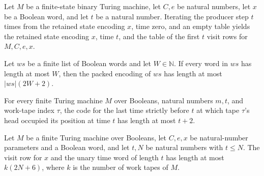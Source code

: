 \begin{lemma}
\label{Complexity.clVisitStep_orbit}
\leanok
{}
Let $M$ be a finite-state binary Turing machine, let $C,e$ be natural numbers, let $x$
be a Boolean word, and let $t$ be a natural number. Iterating the producer step $t$
times from the retained state encoding $x$, time zero, and an empty table yields the
retained state encoding $x$, time $t$, and the table of the first $t$ visit rows for
$M,C,e,x$.
\end{lemma}

\begin{lemma}
\label{Complexity.clFields_size}
\leanok
{}
Let $ws$ be a finite list of Boolean words and let $W\in\mathbb N$. If every word in
$ws$ has length at most $W$, then the packed encoding of $ws$ has length at most
$|ws|(2W+2)$.
\end{lemma}

\begin{lemma}
\label{Complexity.clVisitCode_size}
\leanok
{}
For every finite Turing machine $M$ over Booleans, natural numbers $m,t$, and work-tape
index $\tau$, the code for the last time strictly before $t$ at which tape $\tau$'s head
occupied its position at time $t$ has length at most $t+2$.
\end{lemma}

\begin{lemma}
\label{Complexity.clVisitRow_size}
\leanok
{}
Let $M$ be a finite Turing machine over Booleans, let $C,e,x$ be natural-number
parameters and a Boolean word, and let $t,N$ be natural numbers with $t\le N$. The visit
row for $x$ and the unary time word of length $t$ has length at most $k(2N+6)$, where
$k$ is the number of work tapes of $M$.
\end{lemma}

